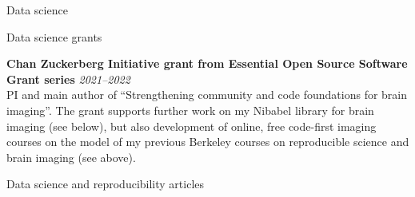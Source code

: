 \documentclass{cv}
\newcommand{\PlaceDateNote}[3]{{\bf #1} \hfill {\em #2} \\#3}
\begin{document}
\begin{cvSection}{Data science}
\begin{cvSubSection}{Reproducible science}
{\end{cvSubSection}

\begin{cvSubSection}{Data science grants}

\PlaceDateNote{Chan Zuckerberg Initiative grant from Essential Open Source
    Software Grant series}{2021--2022} {PI and main author of ``Strengthening
    community and code foundations for brain imaging''. The grant supports
    further work on my Nibabel library for brain imaging (see below), but also
    development of online, free code-first imaging courses on the model of my
    previous Berkeley courses on reproducible science and brain imaging (see
    above).}

\end{cvSubSection}

\begin{cvSubSection}{Data science and reproducibility articles}

\printbibliography[heading=none,
    keyword=datascience,
    keyword=article,
notkeyword=omit]

\end{cvSubSection}

\end{cvSection}
\end{document}
